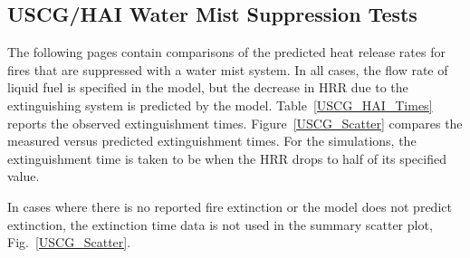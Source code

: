 \clearpage


\subsection{USCG/HAI Water Mist Suppression Tests}

The following pages contain comparisons of the predicted heat release rates for fires that are suppressed with a water mist system. In all cases, the flow rate of liquid fuel is specified in the model, but the decrease in HRR due to the extinguishing system is predicted by the model. Table~\ref{USCG_HAI_Times} reports the observed extinguishment times. Figure~\ref{USCG_Scatter} compares the measured versus predicted extinguishment times. For the simulations, the extinguishment time is taken to be when the HRR drops to half of its specified value.

In cases where there is no reported fire extinction or the model does not predict extinction, the extinction time data is not used in the summary scatter plot, Fig.~\ref{USCG_Scatter}.


